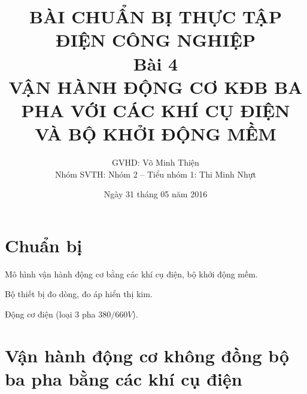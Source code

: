 \documentclass[13pt,a4paper]{extarticle}
\begin{document}
\title{\Large{\textbf{BÀI CHUẨN BỊ THỰC TẬP ĐIỆN CÔNG NGHIỆP}}\\\vspace{1cm}\textbf{Bài 4}\\\vspace{.5cm}\textbf{VẬN HÀNH ĐỘNG CƠ KĐB BA PHA VỚI CÁC KHÍ CỤ ĐIỆN VÀ BỘ KHỞI ĐỘNG MỀM}}
\date{Ngày 31 tháng 05 năm 2016}
\author{GVHD: Võ Minh Thiện \vspace{.6cm}\\  Nhóm SVTH: Nhóm 2 -- Tiểu nhóm 1: Thi Minh Nhựt}
\maketitle
\tableofcontents
\newpage
{}
\setcounter{page}{1}
\section{Chuẩn bị}
\begin{list}{--}{}
\item Mô hình vận hành động cơ bằng các khí cụ điện, bộ khởi động mềm.
\item Bộ thiết bị đo dòng, đo áp hiển thị kim.
\item Động cơ điện (loại 3 pha $380/660V$).
\end{list}
\section{Vận hành động cơ không đồng bộ ba pha bằng các khí cụ điện}
\end{document}
